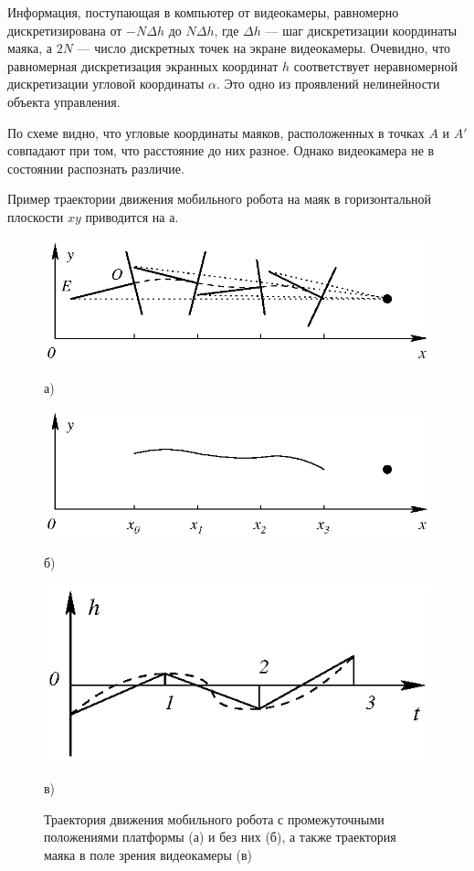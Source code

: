 Информация, поступающая в компьютер от видеокамеры, равномерно
дискретизирована от $-N\Delta h$ до $N\Delta h$, где $\Delta h$ ---
шаг дискретизации координаты маяка, а $2N$ --- число дискретных точек
на экране видеокамеры.  Очевидно, что равномерная дискретизация
экранных координат $h$ соответствует неравномерной дискретизации
угловой координаты $\alpha$.  Это одно из проявлений нелинейности
объекта управления.

По схеме видно, что угловые координаты маяков, расположенных в точках
$A$ и $A'$ совпадают при том, что расстояние до них разное.  Однако
видеокамера не в состоянии распознать различие.

Пример траектории движения мобильного робота на маяк в горизонтальной
плоскости $xy$ приводится на а.

\begin{figure}[h]
\centerline{\includegraphics{moby_trajectory_a}}
\centerline{а)}
\centerline{\includegraphics{moby_trajectory_b}}
\centerline{б)}
\centerline{\includegraphics{moby_trajectory_c}}
\centerline{в)}
\caption{Траектория движения мобильного робота с промежуточными положениями
         платформы (а) и без них (б), а также траектория маяка в поле зрения
         видеокамеры (в)}
\label{fig:moby_trajectory}
\end{figure}


